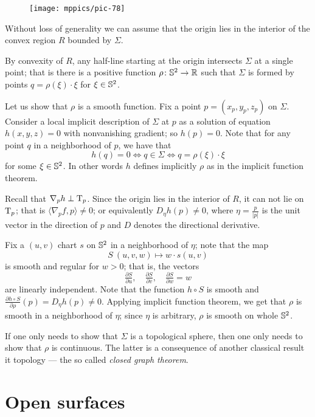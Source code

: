 \begin{wrapfigure}{O}{33 mm}
\vskip-0mm
\centering
\texttt{[image: mppics/pic-78]}
\vskip-0mm
\end{wrapfigure}

Without loss of generality we can assume that the origin lies in the interior of the convex region $R$ bounded by $\Sigma$.

By convexity of $R$, any half-line starting at the origin intersects $\Sigma$ at a single point;
that is there is a positive function $\rho\colon\mathbb{S}^2\to\mathbb{R}$ such that $\Sigma$ is formed by points $q=\rho(\xi)\cdot \xi$ for $\xi\in \mathbb{S}^2$.

Let us show that $\rho$ is a smooth function.
Fix a point $p=(x_p,y_p,z_p)$ on $\Sigma$.
Consider a local implicit description of $\Sigma$ at $p$ as a solution of equation $h(x,y,z)=0$ with nonvanishing gradient;
so $h(p)=0$.
Note that for any point $q$ in a neighborhood of $p$, we have that 
\[h(q)=0 \iff q\in \Sigma \iff q=\rho(\xi)\cdot\xi\] for some $\xi\in \mathbb{S}^2$.
In other words $h$ defines implicitly $\rho$ as in the implicit function theorem.



Recall that $\nabla_p h\perp \mathrm{T}_p$.
Since the origin lies in the interior of $R$, it can not lie on $\mathrm{T}_p$;
that is $\langle\nabla_p f,p \rangle\ne0$;
or equivalently $D_\eta h(p)\ne 0$, where $\eta=\tfrac{p}{|p|}$ is the unit vector in the direction of $p$ and $D$ denotes the directional derivative.

Fix a $(u,v)$ chart $s$ on $\mathbb{S}^2$ in a neighborhood of $\eta$;
note that the map 
\[S\:(u,v,w)\mapsto w\cdot s(u,v)\] 
is smooth and regular for $w>0$; that is, the vectors 
\[\tfrac{\partial S}{\partial u},\quad \tfrac{\partial S}{\partial v},\quad  \tfrac{\partial S}{\partial w}=w\] are linearly independent.
Note that the function $h\circ S$ is smooth and
$\tfrac{\partial h\circ S}{\partial \rho}(p)=D_\eta h(p)\ne 0$.
Applying implicit function theorem, we get that $\rho$ is smooth in a neighborhood of $\eta$;
since $\eta$ is arbitrary, $\rho$ is smooth on whole $\mathbb{S}^2$.
\qeds


If one only needs to show that $\Sigma$ is a topological sphere, then one only needs to show that $\rho$ is continuous.
The latter is a consequence of another classical result it topology --- the so called \emph{closed graph theorem}.

\section*{Open surfaces}

